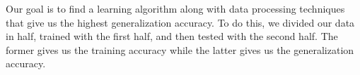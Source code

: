Our goal is to find a learning algorithm along with data processing
techniques that give us the highest generalization accuracy. To do
this, we divided our data in half, trained with the first half, and
then tested with the second half. The former gives us the training
accuracy while the latter gives us the generalization accuracy.
